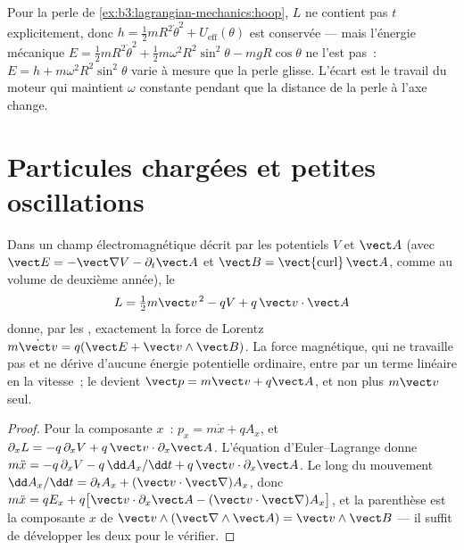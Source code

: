\begin{example}\label{ex:b3:lagrangian-mechanics:hoop-energy}
Pour la perle de \cref{ex:b3:lagrangian-mechanics:hoop}, $L$ ne contient
pas $t$ explicitement, donc $h = \tfrac12 mR^2\dot\theta^2 + U_{\text{eff}}
(\theta)$ est conservée --- mais l'énergie mécanique $E = \tfrac12
mR^2\dot\theta^2 + \tfrac12 m\omega^2R^2\sin^2\theta - mgR\cos\theta$
ne l'est pas~: $E = h + m\omega^2R^2\sin^2\theta$ varie à mesure que la
perle glisse. L'écart est le travail du moteur qui maintient $\omega$
constante pendant que la distance de la perle à l'axe change.
\end{example}

\section{Particules chargées et petites oscillations}

\begin{proposition}\label{prop:b3:lagrangian-mechanics:charge}
Dans un champ électromagnétique décrit par les potentiels $V$ et
$\vect A$ (avec $\vect E = -\vect\nabla V - \partial_t\vect A$ et
$\vect B = \operatorname{\vect{curl}}\vect A$, comme au volume de
deuxième année), le 
\[
L = \tfrac12 m\vect v^{\,2} - qV + q\,\vect v\cdot\vect A
\]
donne, par les , exactement la force de
Lorentz $m\dot{\vect v} = q(\vect E + \vect v\wedge\vect B)$. La force
magnétique, qui ne travaille pas et ne dérive d'aucune énergie
potentielle ordinaire, entre par un terme linéaire en la vitesse~; le
 devient $\vect p = m\vect v + q\vect A$, et non plus
$m\vect v$ seul.
\end{proposition}

\begin{proof}
Pour la composante $x$~: $p_x = m\dot x + qA_x$, et
$\partial_xL = -q\,\partial_xV + q\,\vect v\cdot\partial_x\vect A$.
L'équation d'Euler--Lagrange donne $m\ddot x = -q\,\partial_xV -
q\,\dd A_x/\dd t + q\,\vect v\cdot\partial_x\vect A$. Le long du
mouvement $\dd A_x/\dd t = \partial_tA_x + (\vect v\cdot\vect\nabla)A_x$,
donc $m\ddot x = qE_x + q\big[\vect v\cdot\partial_x\vect A - (\vect v\cdot
\vect\nabla)A_x\big]$, et la parenthèse est la composante $x$ de $\vect
v\wedge(\vect\nabla\wedge\vect A) = \vect v\wedge\vect B$ --- il suffit
de développer les deux pour le vérifier.
\end{proof}

